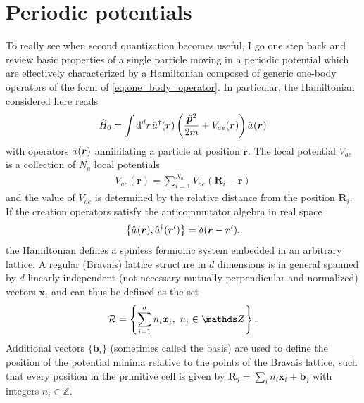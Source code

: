 \section{Periodic potentials}
\label{sec:periodic_potentials}
To really see when second quantization becomes useful, I go one step back and review basic properties of a single particle moving in a periodic potential which are effectively characterized by a Hamiltonian composed of generic one-body operators of the form of \cref{eq:one_body_operator}.
In particular, the Hamiltonian considered here reads
\begin{align}
    \hat H_0 = \int\rd^d r\, \hat a^\dag({\bm r})\brlr{\frac{\hat{\bm p}^2}{2m}+V_{ae}({\bm r})}\hat a^\pdag({\bm r})
\end{align}
with operators $\hat a^\pdag({\bm r})$ annihilating a particle at position $\bm r$.
The local potential $V_{ae}$ is a collection of $N_a$ local potentials
\begin{align}
    V_{ae}({\bm r}) = \sum_{i=1}^{N_a}V_{ae}({\bm R}_i - {\bm r})
\end{align}
and the value of $V_{ae}$ is determined by the relative distance from the position ${\bm R}_i$.
If the creation operators satisfy the anticommutator algebra in real space
\begin{align}
    \anticommutator{\hat a^\pdag({\bm r}),\hat a^\dag({\bm r'})}=\delta({\bm r}-{\bm r'}),
\end{align}
the Hamiltonian defines a spinless fermionic system embedded in an arbitrary lattice.
A regular (Bravais) lattice structure in $d$ dimensions is in general spanned by $d$ linearly independent (not necessary mutually perpendicular and normalized) vectors ${\bm x}_i$ and can thus be defined as the set
\begin{align}
    \mathcal{R} = \anticommutator{\sum_{i=1}^d n_i {\bm x}_i,\ n_i\in\mathds Z}.
\end{align}
Additional vectors $\{{\bm b}_i\}$ (sometimes called the basis) are used to define the position of the potential minima relative to the points of the Bravais lattice, such that every position in the primitive cell is given by ${\bm R}_j = \sum_i n_i {\bm x}_i + {\bm b}_j$ with integers $n_i\in\mathds Z$.
